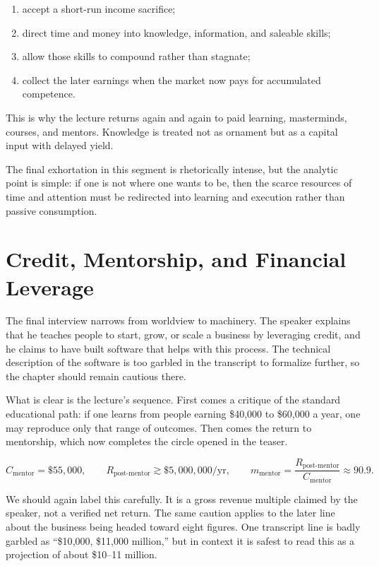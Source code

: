 \begin{enumerate}
\item accept a short-run income sacrifice;
\item direct time and money into knowledge, information, and saleable skills;
\item allow those skills to compound rather than stagnate;
\item collect the later earnings when the market now pays for accumulated competence.
\end{enumerate}

This is why the lecture returns again and again to paid learning, masterminds, courses, and mentors. Knowledge is treated not as ornament but as a capital input with delayed yield.

The final exhortation in this segment is rhetorically intense, but the analytic point is simple: if one is not where one wants to be, then the scarce resources of time and attention must be redirected into learning and execution rather than passive consumption.

\section{Credit, Mentorship, and Financial Leverage}

The final interview narrows from worldview to machinery. The speaker explains that he teaches people to start, grow, or scale a business by leveraging credit, and he claims to have built software that helps with this process. The technical description of the software is too garbled in the transcript to formalize further, so the chapter should remain cautious there.

What is clear is the lecture's sequence. First comes a critique of the standard educational path: if one learns from people earning \$40{,}000 to \$60{,}000 a year, one may reproduce only that range of outcomes. Then comes the return to mentorship, which now completes the circle opened in the teaser.

\begin{equation}
C_{\text{mentor}}=\$55{,}000,
\qquad
R_{\text{post-mentor}}\gtrsim \$5{,}000{,}000\text{/yr},
\qquad
m_{\text{mentor}}
=
\frac{R_{\text{post-mentor}}}{C_{\text{mentor}}}
\approx 90.9.
\end{equation}

We should again label this carefully. It is a gross revenue multiple claimed by the speaker, not a verified net return. The same caution applies to the later line about the business being headed toward eight figures. One transcript line is badly garbled as ``\$10{,}000, \$11{,}000 million,'' but in context it is safest to read this as a projection of about \$10--11 million.

